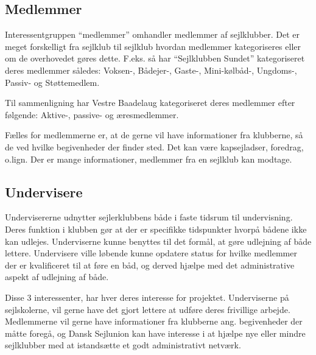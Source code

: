 \subsection{Medlemmer}

Interessentgruppen ``medlemmer'' omhandler medlemmer af sejlklubber. Det er meget forskelligt fra sejlklub til
sejlklub hvordan medlemmer kategoriseres eller om de overhovedet gøres dette. F.eks. så har ``Sejlklubben
Sundet'' kategoriseret deres medlemmer således: Voksen-, Bådejer-, Gaste-, Mini-kølbåd-, Ungdoms-, Passiv- og
Støttemedlem.

Til sammenligning har Vestre Baadelaug kategoriseret deres medlemmer efter følgende: Aktive-, passive- og
æresmedlemmer.

Fælles for medlemmerne er, at de gerne vil have informationer fra klubberne, så de ved hvilke begivenheder der finder sted. Det kan være kapsejladser, foredrag, o.lign. Der er mange informationer, medlemmer fra en sejlklub kan modtage.



\subsection{Undervisere}

Undervisererne udnytter sejlerklubbens både i faste tidsrum til undervisning. Deres funktion i
klubben gør at der er specifikke tidspunkter hvorpå bådene ikke kan udlejes. Underviserne kunne benyttes til
det formål, at gøre udlejning af både lettere. Undervisere ville løbende kunne opdatere status for hvilke
medlemmer der er kvalificeret til at føre en båd, og derved hjælpe med det administrative aspekt af udlejning
af både.

Disse 3 interessenter, har hver deres interesse for projektet. Underviserne på sejlskolerne, vil gerne have det gjort lettere at udføre deres frivillige arbejde. Medlemmerne vil gerne have informationer fra klubberne ang. begivenheder der måtte foregå, og Dansk Sejlunion kan have interesse i at hjælpe nye eller mindre sejlklubber med at istandsætte et godt administrativt netværk.

